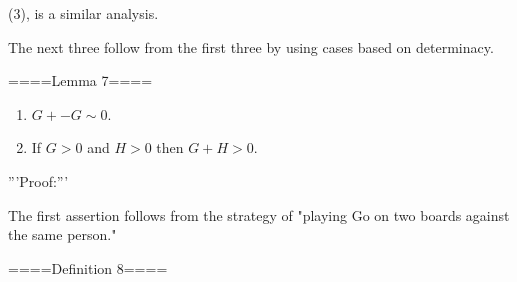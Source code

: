 (3), is a similar analysis.

The next three follow from the first three by using cases based on determinacy.

====Lemma 7====
\begin{enumerate}
  \item  $G+ -G\sim 0$.
  \item  If $G>0$ and $H>0$ then $G+H>0$.
\end{enumerate}
'''Proof:'''

The first assertion follows from the strategy of "playing Go on two boards against the same person."


====Definition 8====
